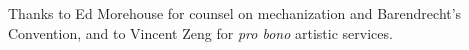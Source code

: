 Thanks to Ed Morehouse for counsel on mechanization and Barendrecht's
Convention, and to Vincent Zeng for \textit{pro bono} artistic services.
